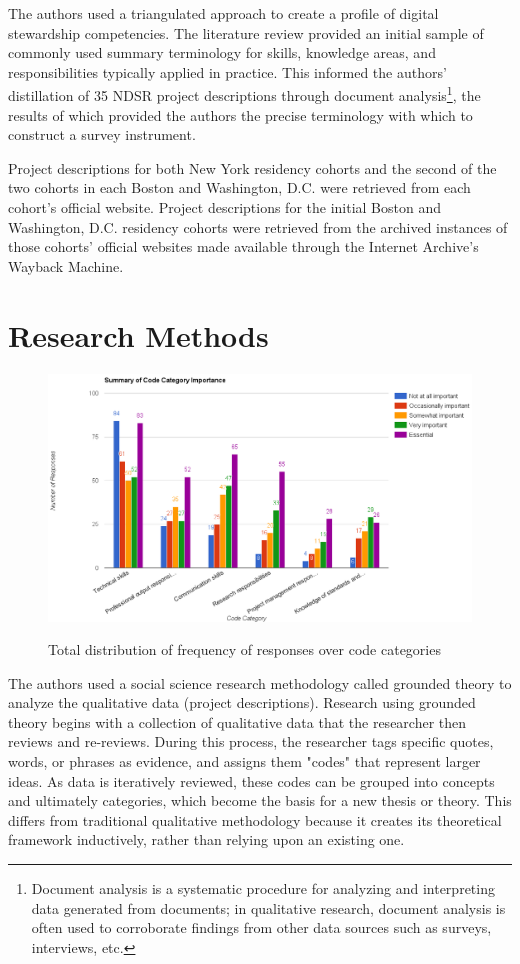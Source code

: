 \documentclass{acm_proc_article-sp}
\begin{document}
The authors used a triangulated approach to create a profile of digital stewardship competencies. The literature review provided an initial sample of commonly used summary terminology for skills, knowledge areas, and responsibilities typically applied in practice. This informed the authors' distillation of 35 NDSR project descriptions through document analysis\footnote{Document analysis is a systematic procedure for analyzing and interpreting data generated from documents; in qualitative research, document analysis is often used to corroborate findings from other data sources such as surveys, interviews, etc.\cite{22}}, the results of which provided the authors the precise terminology with which to construct a survey instrument. 

Project descriptions for both New York residency cohorts\cite{23} and the second of the two cohorts in each Boston\cite{24} and Washington, D.C.\cite{25} were retrieved from each cohort's official website. Project descriptions for the initial Boston\cite{26} and Washington, D.C.\cite{27} residency cohorts were retrieved from the archived instances of those cohorts' official websites made available through the Internet Archive's Wayback Machine.  

\section{Research Methods}
\begin{figure}[!t]
  \includegraphics[scale=0.5]{total_skills.png} 
   \label{Figure 1.}   
    \caption{Total distribution of frequency of responses over code categories}
\end{figure}

The authors used a social science research methodology called grounded theory\cite{28} to analyze the qualitative data (project descriptions). Research using grounded theory begins with a collection of qualitative data that the researcher then reviews and re-reviews. During this process, the researcher tags specific quotes, words, or phrases as evidence, and assigns them "codes" that represent larger ideas.\cite{29} As data is iteratively reviewed, these codes can be grouped into concepts and ultimately categories, which become the basis for a new thesis or theory. This differs from traditional qualitative methodology because it creates its theoretical framework inductively, rather than relying upon an existing one.\cite{30}
\end{document}
